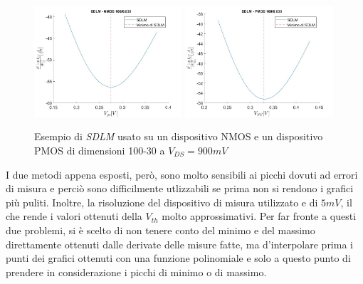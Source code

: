 \documentclass[12pt, letterpaper]{book}
\begin{document}
\begin{figure}[h!]
  \centering
  \includegraphics[width=0.49\textwidth]{SDLM-N4-100-30-NoFit}
  \includegraphics[width=0.49\textwidth]{SDLM-P1-100-30-NoFit}
  \caption{Esempio di \emph{SDLM} usato su un dispositivo NMOS e un dispositivo PMOS di dimensioni 100-30 a $V_{DS} = 900 mV$}
\end{figure}

I due metodi appena esposti, però, sono molto sensibili ai picchi dovuti ad errori di misura e perciò sono difficilmente utlizzabili se prima non si rendono i grafici più puliti. Inoltre, la risoluzione del dispositivo di misura utilizzato e di $5 mV$, il che rende i valori ottenuti della $V_{th}$ molto approssimativi.
Per far fronte a questi due problemi, si è scelto di non tenere conto del minimo e del massimo direttamente ottenuti dalle derivate delle misure fatte, ma d'interpolare prima i punti dei grafici ottenuti con una funzione polinomiale e solo a questo punto di prendere in considerazione i picchi di minimo o di massimo. \\
\end{document}
